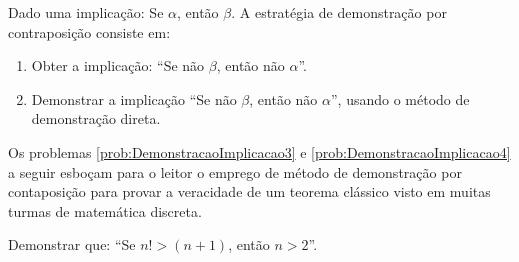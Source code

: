 \begin{definition}\label{Def:DemContra}
    Dado uma implicação: Se $\alpha$, então $\beta$. A estratégia de demonstração por contraposição consiste em:
	\begin{enumerate}
	    \item Obter a implicação: ``Se não $\beta$, então não $\alpha$''.
	    \item Demonstrar a implicação ``Se não $\beta$, então não $\alpha$'', usando o método de demonstração direta.
	\end{enumerate}
\end{definition}

Os problemas \ref{prob:DemonstracaoImplicacao3} e \ref{prob:DemonstracaoImplicacao4} a seguir esboçam para o leitor o emprego de método de demonstração por contaposição para provar a veracidade de um teorema clássico visto em muitas turmas de matemática discreta.

\begin{problem}\label{prob:DemonstracaoImplicacao3}
	Demonstrar que: ``Se $n! > (n+1)$, então $n > 2$''.
\end{problem}

